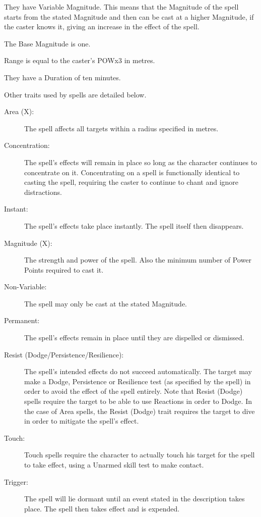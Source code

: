 \begin{rpg-list}
\item They have Variable Magnitude. This means that the Magnitude of the spell starts from the stated Magnitude and then can be cast at a higher Magnitude, if the caster knows it, giving an increase in the effect of the spell. %
\item The Base Magnitude is one. 
\item Range is equal to the caster’s POWx3 in metres.
\item They have a Duration of ten minutes.
\end{rpg-list}

Other traits used by spells are detailed below. 
\begin{description}
	\item[Area (X):] The spell affects all targets within a radius specified in metres. 
	\item[Concentration:] The spell’s effects will remain in place so long as the character continues to concentrate on it. Concentrating on a spell is functionally identical to casting the spell, requiring the caster to continue to chant and ignore distractions. 
	\item[Instant:] The spell’s effects take place instantly. The spell itself then disappears. 
	\item[Magnitude (X):] The strength and power of the spell. Also the minimum number of Power Points required to cast it. 
	\item[Non-Variable:] The spell may only be cast at the stated Magnitude.
	\item[Permanent:] The spell’s effects remain in place until they are dispelled or dismissed. 
	\item[Resist (Dodge/Persistence/Resilience):] The spell’s intended effects do not succeed automatically. The target may make a Dodge, Persistence or Resilience test (as specified by the spell) in order to avoid the effect of the spell entirely. Note that Resist (Dodge) spells require the target to be able to use Reactions in order to Dodge. In the case of Area spells, the Resist (Dodge) trait requires the target to dive in order to mitigate the spell’s effect. 
	\item[Touch:] Touch spells require the character to actually touch his target for the spell to take effect, using a Unarmed skill test to make contact. %
	\item[Trigger:] The spell will lie dormant until an event stated in the description takes place. The spell then takes effect and is expended.
\end{description}




